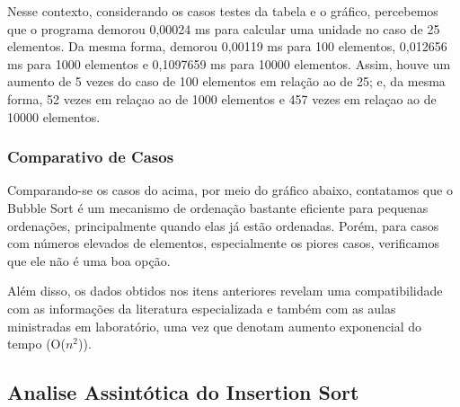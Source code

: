 \documentclass[a4paper, 12pt]{article}
\begin{document}
\vspace{0.8cm}
Nesse contexto, considerando os casos testes da tabela e o gráfico, percebemos que o programa demorou 0,00024 ms para calcular uma unidade no caso de 25 elementos. Da mesma forma, demorou 0,00119 ms para 100 elementos, 0,012656 ms para 1000 elementos e 0,1097659 ms para 10000 elementos. Assim, houve um aumento de 5 vezes do caso de 100 elementos em relação ao de 25; e, da mesma forma, 52 vezes em relaçao ao de 1000 elementos e 457 vezes em relaçao ao de 10000 elementos.


\subsubsection{Comparativo de Casos}

\tab{ }Comparando-se os casos do acima, por meio do gráfico abaixo, contatamos que o Bubble Sort é um mecanismo de ordenação bastante eficiente para pequenas ordenações, principalmente quando elas já estão ordenadas. Porém, para casos com números elevados de elementos, especialmente os piores casos, verificamos que ele não é uma boa opção.

\begin{center}
\end{center}

Além disso, os dados obtidos nos itens anteriores revelam uma compatibilidade com as informações da literatura especializada e também com as aulas ministradas em laboratório, uma vez que denotam aumento exponencial do tempo (O($n^2$)).

\vspace{0.8cm}
\subsection{Analise Assintótica do Insertion Sort}
\end{document}
